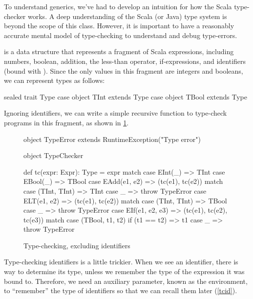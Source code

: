 \documentclass{book}
\begin{document}
To understand generics, we've had to develop an intuition for how the Scala
type-checker works. A deep understanding of the Scala (or Java) type system is
beyond the scope of this class. However, it is important to have a reasonably
accurate mental model of type-checking to understand and debug type-errors.

 is a data structure that represents a fragment of
Scala expressions, including numbers, boolean, addition, the less-than operator,
if-expressions, and identifiers (bound with ). Since
the only values in this fragment are integers and booleans, we can represent
types as follows:

\begin{scalacode}
sealed trait Type
case object TInt extends Type
case object TBool extends Type
\end{scalacode}

Ignoring identifiers, we can write a simple recursive function to type-check
programs in this fragment, as shown in \cref{simpletc}.

\begin{figure}
\begin{scalacode}
object TypeError extends RuntimeException("Type error")

object TypeChecker {

  def tc(expr: Expr): Type = expr match {
    case EInt(_) => TInt
    case EBool(_) => TBool
    case EAdd(e1, e2) => (tc(e1), tc(e2)) match {
      case (TInt, TInt) => TInt
      case _ => throw TypeError
    }
    case ELT(e1, e2) => (tc(e1), tc(e2)) match {
      case (TInt, TInt) => TBool
      case _ => throw TypeError
    }
    case EIf(e1, e2, e3) => (tc(e1), tc(e2), tc(e3)) match {
      case (TBool, t1, t2) if (t1 == t2) => t1
      case _ => throw TypeError
    }
  }
}
\end{scalacode}
\caption{Type-checking, excluding identifiers}\label{simpletc}
\end{figure}

Type-checking identifiers is a little trickier. When we see an identifier,
there is way to determine its type, unless we remember the type
of the expression it was bound to. Therefore, we need an auxiliary
parameter, known as the environment, to ``remember'' the type of identifiers
so that we can recall them later (\cref{tcid}).
\end{document}
